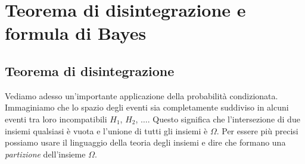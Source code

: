 \section{Teorema di disintegrazione e formula di Bayes}
\label{sec:05_bayes}

\subsection{Teorema di disintegrazione}

Vediamo adesso un'importante applicazione della probabilità condizionata. 
Immaginiamo che lo spazio degli eventi sia completamente suddiviso in alcuni 
eventi tra loro incompatibili $H_1$, $H_2$, $\dots$. Questo significa che 
l'intersezione di due insiemi qualsiasi è vuota e l'unione di tutti gli 
insiemi 
è $\Omega$. Per essere più precisi possiamo usare il linguaggio della teoria 
degli insiemi e dire che formano una \emph{partizione} dell'insieme $\Omega$. 

